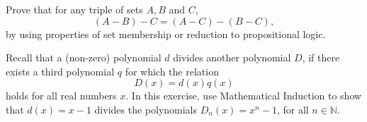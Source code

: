\documentclass[11pt]{exam}
\begin{document}
\begin{questions}
\newpage

\addpoints
\question[4] Prove that for any triple of sets $A,B$ and $C$, 
\begin{equation*}
(A-B)-C=(A-C)-(B-C),
\end{equation*}
by using properties of set membership or reduction to propositional logic.
\newpage

\addpoints
\question[4] Recall that a (non-zero) polynomial $d$ divides another polynomial $D$, if there exists a third polynomial $q$ for which the relation 
\begin{equation*}
D(x)=d(x)q(x)
\end{equation*}
holds for all real numbers $x$. In this exercise, use Mathematical Induction to show that $d(x)=x-1$ divides the polynomials $D_n(x)=x^n-1$, for all $n \in \mathbb{N}$.



\end{questions}
\end{document}
